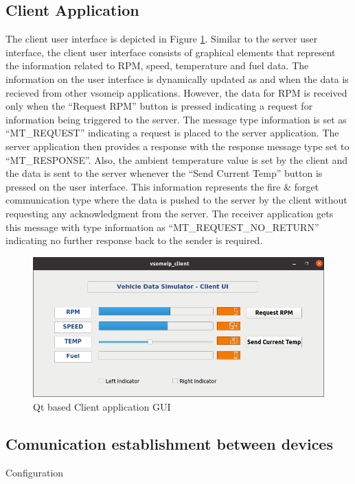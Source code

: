 \subsection{Client Application}
The client user interface is depicted in Figure \ref{fig:clientUI}. Similar to the server user interface, the client user interface consists of graphical elements that represent the information related to RPM, speed, temperature and fuel data. The information on the user interface is dynamically updated as and when the data is recieved from other vsomeip applications. However, the data for RPM is received only when the "`Request RPM"' button is pressed indicating a request for information being triggered to the server. The message type information is set as "`MT\_REQUEST"' indicating a request is placed to the server application. The server application then provides a response with the response message type set to "`MT\_RESPONSE"'.  Also, the ambient temperature value is set by the client and the data is sent to the server whenever the "`Send Current Temp"' button is pressed on the user interface. This information represents the fire \& forget communication type where the data is pushed to the server by the client without requesting any acknowledgment from the server. The receiver application gets this message with type information as "`MT\_REQUEST\_NO\_RETURN"' indicating no further response back to the sender is required.

\begin{figure}[!htb] 

	\centering
		\includegraphics[width=1\textwidth]{images/clientUI.png}
	\caption{Qt based Client application GUI}
	\label{fig:clientUI}
\end{figure}

\subsection{Comunication establishment between devices}
Configuration

